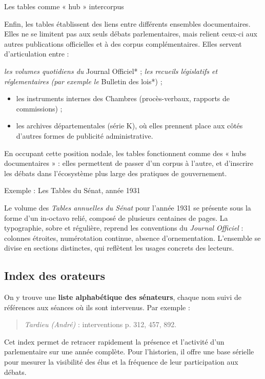 Les tables comme « hub » intercorpus

Enfin, les tables établissent des liens entre différents ensembles documentaires. Elles ne se limitent pas aux seuls débats parlementaires, mais relient ceux-ci aux autres publications officielles et à des corpus complémentaires. Elles servent d’articulation entre :

\emph{ les volumes quotidiens du }Journal Officiel* ;
\emph{ les recueils législatifs et réglementaires (par exemple le }Bulletin des lois*) ;
\begin{itemize}
\item les instruments internes des Chambres (procès-verbaux, rapports de commissions) ;
\item les archives départementales (série K), où elles prennent place aux côtés d’autres formes de publicité administrative.

\end{itemize}
En occupant cette position nodale, les tables fonctionnent comme des « hubs documentaires » : elles permettent de passer d’un corpus à l’autre, et d’inscrire les débats dans l’écosystème plus large des pratiques de gouvernement.

Exemple : Les Tables du Sénat, année 1931

Le volume des \emph{Tables annuelles du Sénat} pour l’année 1931 se présente sous la forme d’un in-octavo relié, composé de plusieurs centaines de pages. La typographie, sobre et régulière, reprend les conventions du \emph{Journal Officiel} : colonnes étroites, numérotation continue, absence d’ornementation. L’ensemble se divise en sections distinctes, qui reflètent les usages concrets des lecteurs.

\subsection{Index des orateurs}

On y trouve une \textbf{liste alphabétique des sénateurs}, chaque nom suivi de références aux séances où ils sont intervenus. Par exemple :

\begin{quote}
\emph{Tardieu (André)} : interventions p. 312, 457, 892.

\end{quote}
Cet index permet de retracer rapidement la présence et l’activité d’un parlementaire sur une année complète. Pour l’historien, il offre une base sérielle pour mesurer la visibilité des élus et la fréquence de leur participation aux débats.

